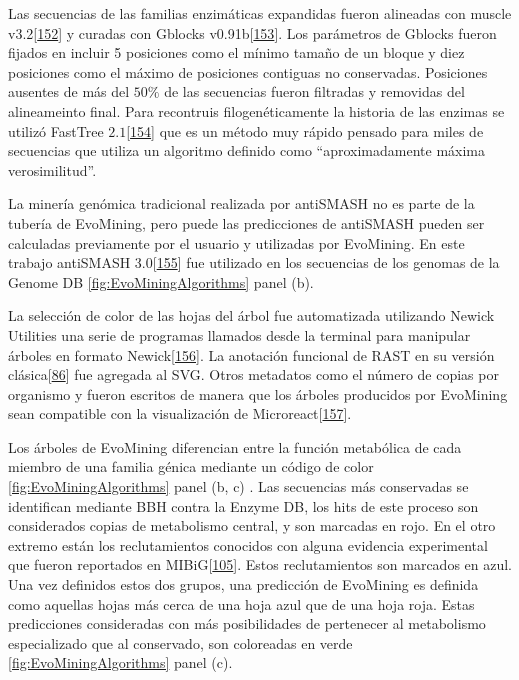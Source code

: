 \documentclass[12pt,twoside]{reedthesis}
\begin{document}
  Las secuencias de las familias enzimáticas expandidas fueron alineadas
  con muscle v3.2{[}\protect\hyperlink{ref-edgar_muscle_2004}{152}{]} y
  curadas con Gblocks
  v0.91b{[}\protect\hyperlink{ref-castresana_selection_2000}{153}{]}. Los
  parámetros de Gblocks fueron fijados en incluir 5 posiciones como el
  mínimo tamaño de un bloque y diez posiciones como el máximo de
  posiciones contiguas no conservadas. Posiciones ausentes de más del
  \(50\%\) de las secuencias fueron filtradas y removidas del alineameinto
  final. Para recontruis filogenéticamente la historia de las enzimas se
  utilizó FastTree
  \(2.1\){[}\protect\hyperlink{ref-price_fasttree_2010}{154}{]} que es un
  método muy rápido pensado para miles de secuencias que utiliza un
  algoritmo definido como ``aproximadamente máxima verosimilitud''.
  
  La minería genómica tradicional realizada por antiSMASH no es parte de
  la tubería de EvoMining, pero puede las predicciones de antiSMASH pueden
  ser calculadas previamente por el usuario y utilizadas por EvoMining. En
  este trabajo antiSMASH
  3.0{[}\protect\hyperlink{ref-weber_antismash3_2015}{155}{]} fue
  utilizado en los secuencias de los genomas de la Genome DB
  \autoref{fig:EvoMiningAlgorithms} panel (b).
  
  La selección de color de las hojas del árbol fue automatizada utilizando
  Newick Utilities una serie de programas llamados desde la terminal para
  manipular árboles en formato
  Newick{[}\protect\hyperlink{ref-junier_newick_2010}{156}{]}. La
  anotación funcional de RAST en su versión
  clásica{[}\protect\hyperlink{ref-aziz_rast_2008}{86}{]} fue agregada al
  SVG. Otros metadatos como el número de copias por organismo y fueron
  escritos de manera que los árboles producidos por EvoMining sean
  compatible con la visualización de
  Microreact{[}\protect\hyperlink{ref-argimon_microreact_2016}{157}{]}.
  
  Los árboles de EvoMining diferencian entre la función metabólica de cada
  miembro de una familia génica mediante un código de color
  \autoref{fig:EvoMiningAlgorithms} panel (b, c) . Las secuencias más
  conservadas se identifican mediante BBH contra la Enzyme DB, los hits de
  este proceso son considerados copias de metabolismo central, y son
  marcadas en rojo. En el otro extremo están los reclutamientos conocidos
  con alguna evidencia experimental que fueron reportados en
  MIBiG{[}\protect\hyperlink{ref-medema_minimum_2015}{105}{]}. Estos
  reclutamientos son marcados en azul. Una vez definidos estos dos grupos,
  una predicción de EvoMining es definida como aquellas hojas más cerca de
  una hoja azul que de una hoja roja. Estas predicciones consideradas con
  más posibilidades de pertenecer al metabolismo especializado que al
  conservado, son coloreadas en verde \autoref{fig:EvoMiningAlgorithms}
  panel (c).
  
\end{document}
